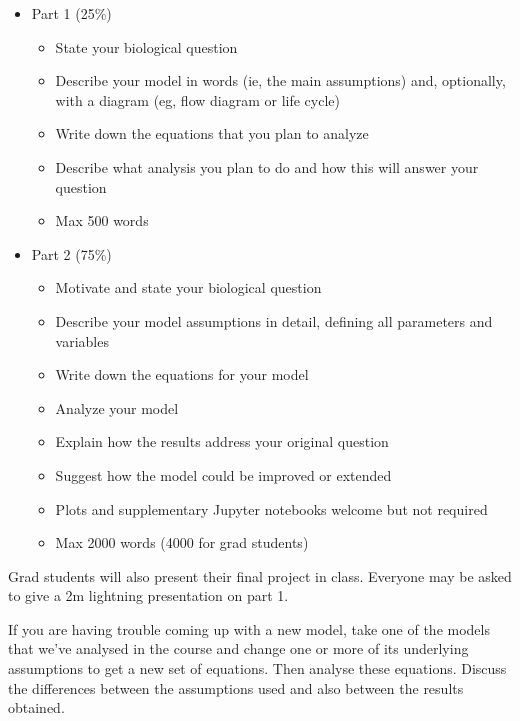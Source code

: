 \documentclass[
]{article}
\providecommand{\tightlist}{%
  \setlength{\itemsep}{0pt}\setlength{\parskip}{0pt}}
\begin{document}
\begin{itemize}
\tightlist
\item[$\textcolor{taskgreen}{\boxed{\checkmark}}$]
  Part 1 (25\%)

  \begin{itemize}
  \tightlist
  \item
    State your biological question
  \item
    Describe your model in words (ie, the main assumptions) and,
    optionally, with a diagram (eg, flow diagram or life cycle)
  \item
    Write down the equations that you plan to analyze
  \item
    Describe what analysis you plan to do and how this will answer your
    question
  \item
    Max 500 words
  \end{itemize}
\item[$\textcolor{taskgreen}{\boxed{\checkmark}}$]
  Part 2 (75\%)

  \begin{itemize}
  \tightlist
  \item
    Motivate and state your biological question
  \item
    Describe your model assumptions in detail, defining all parameters
    and variables
  \item
    Write down the equations for your model
  \item
    Analyze your model
  \item
    Explain how the results address your original question
  \item
    Suggest how the model could be improved or extended
  \item
    Plots and supplementary Jupyter notebooks welcome but not required
  \item
    Max 2000 words (4000 for grad students)
  \end{itemize}
\end{itemize}

\begin{tcolorbox}[breakable,colback=cyan!8,colframe=cyan!65!black,title=Class presentations,fonttitle=\bfseries]
Grad students will also present their final project in class. Everyone
may be asked to give a 2m lightning presentation on part 1.\end{tcolorbox}

\begin{tcolorbox}[breakable,colback=green!8,colframe=green!65!black,title=Tip,fonttitle=\bfseries]
If you are having trouble coming up with a new model, take one of the
models that we've analysed in the course and change one or more of its
underlying assumptions to get a new set of equations. Then analyse these
equations. Discuss the differences between the assumptions used and also
between the results obtained.\end{tcolorbox}
\end{document}
